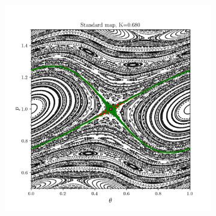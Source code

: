 \begin{figure}[h!]
    \centering
    \begin{subfigure}[t]{0.43\textwidth}
        \centering
        \includegraphics[width=\textwidth]{images/intro/manifold_0.680_28.png}
        \caption{}
        \label{fig:standard-map}
    \end{subfigure}
    \hfill
    \begin{subfigure}[t]{0.56\textwidth}
        \centering

\end{subfigure}
\end{figure}

